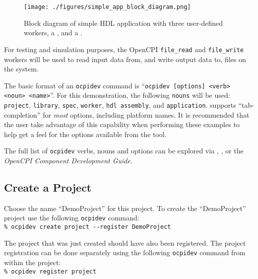 \begin{figure}[h]
        \centering
        \texttt{[image: ./figures/simple\_app\_block\_diagram.png]}
        \caption{Block diagram of simple HDL application with three user-defined workers, a , and a .}
        \label{fig:simple_app_diagram}
\end{figure}
For testing and simulation purposes, the OpenCPI \verb+file_read+ and \verb+file_write+ workers will be used to read input data from, and write output data to, files on the system.\newline

The basic format of an \verb+ocpidev+ command is ``\verb+ocpidev [options] <verb> <noun> <name>+''.
For this demonstration, the following \verb+nouns+ will be used: \verb+project+, \verb+library+, \verb+spec+, \verb+worker+, \verb+hdl assembly+, and \verb+application+.
 supports ``tab-completion'' for \textit{most} options, including platform names.
It is recommended that the user take advantage of this capability when performing these examples to help get a feel for the options available from the tool.
\newline

The full list of \verb+ocpidev+ verbs, nouns and options can be explored via , , or the \textit{OpenCPI Component Development Guide}.

\subsection{Create a Project}
Choose the name ``DemoProject'' for this project. To create the ``DemoProject'' project use the following \verb+ocpidev+ command:\\

\forceindent\verb+% ocpidev create project --register DemoProject+\\

The project that was just created should have also been registered.
The project registration can be done separately using the following \verb+ocpidev+ command from within the project:\\

\forceindent\forceindent\verb+% ocpidev register project+\\

